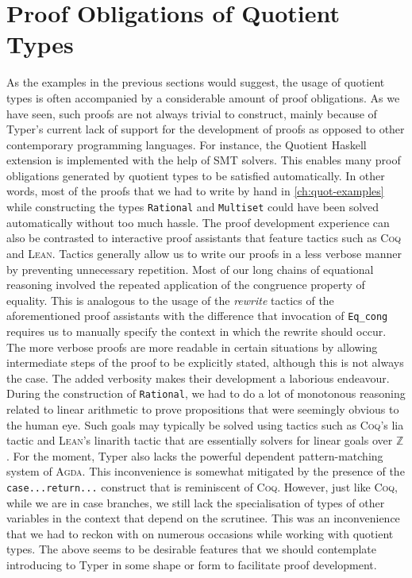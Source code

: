 \documentclass[12pt,twoside,maitrise]{dms}
\theoremstyle{definition}
\numberwithin{equation}{section}
\numberwithin{table}{chapter}
\numberwithin{figure}{chapter}
\newcommand\kw[1] {\textsf{#1}}
\newcommand\id[1] {\texttt{#1}}
\newcommand\fn[1] {\texttt{#1}}
\def\Coq{\textsc{Coq}\xspace}
\def\Agda{\textsc{Agda}\xspace}
\def\Lean{\textsc{Lean}\xspace}
\begin{document}
\section*{Proof Obligations of Quotient Types}

As the examples in the previous sections would suggest, the usage of quotient
types is often accompanied by a considerable amount of proof obligations. As we
have seen, such proofs are not always trivial to construct, mainly because of
Typer's current lack of support for the development of proofs as opposed to
other contemporary programming languages. For instance, the Quotient Haskell
extension\cite{hewer2023quotient} is implemented with the help of SMT solvers.
This enables many proof obligations generated by quotient types to be satisfied
automatically. In other words, most of the proofs that we had to write by hand
in \autoref{ch:quot-examples} while constructing the types \id{Rational} and
\id{Multiset} could have been solved automatically without too much hassle. The
proof development experience can also be contrasted to interactive proof
assistants that feature tactics such as \Coq{} and \Lean{}. Tactics generally
allow us to write our proofs in a less verbose manner by preventing unnecessary
repetition. Most of our long chains of equational reasoning involved the
repeated application of the congruence property of equality. This is analogous
to the usage of the \emph{rewrite} tactics of the aforementioned proof
assistants with the difference that invocation of \id{Eq\_cong} requires us to
manually specify the context in which the rewrite should occur. The more
verbose proofs are more readable in certain situations by allowing intermediate
steps of the proof to be explicitly stated, although this is not always the
case. The added verbosity makes their development a laborious endeavour. During
the construction of \id{Rational}, we had to do a lot of monotonous reasoning
related to linear arithmetic to prove propositions that were seemingly obvious
to the human eye. Such goals may typically be solved using tactics such as
\Coq{}'s \kw{lia} tactic and \Lean{}'s \kw{linarith} tactic that are
essentially solvers for linear goals over $\mathbb{Z}$. For the moment, Typer
also lacks the powerful dependent pattern-matching system of \Agda{}. This
inconvenience is somewhat mitigated by the presence of the
\fn{\kw{case}...\kw{return}...} construct that is reminiscent of \Coq{}.
However, just like \Coq{}, while we are in \kw{case} branches, we still lack
the specialisation of types of other variables in the context that depend on
the scrutinee. This was an inconvenience that we had to reckon with on numerous
occasions while working with quotient types. The above seems to be desirable
features that we should contemplate introducing to Typer in some shape or form
to facilitate proof development.
\end{document}
